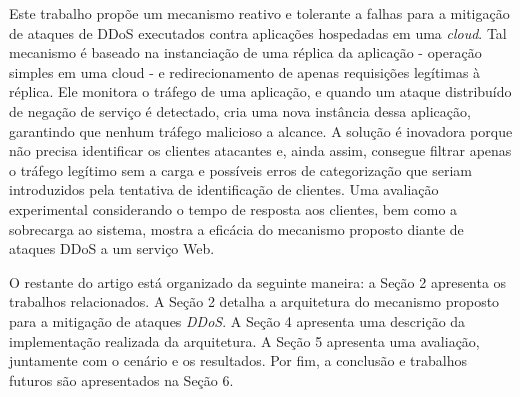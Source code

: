 Este trabalho propõe um mecanismo reativo e tolerante a falhas para a mitigação de ataques de DDoS executados contra aplicações hospedadas em uma \emph{cloud}. Tal mecanismo é baseado na instanciação de uma réplica da aplicação - operação simples em uma cloud - e redirecionamento de apenas requisições legítimas à réplica.  Ele monitora o tráfego de uma aplicação, e quando um ataque distribuído de negação de serviço é detectado, cria uma nova instância dessa aplicação, garantindo que nenhum tráfego malicioso a alcance. A solução é inovadora porque não precisa identificar os clientes atacantes e, ainda assim, consegue filtrar apenas o tráfego legítimo sem a carga e possíveis erros de categorização que seriam introduzidos pela tentativa de identificação de clientes. Uma avaliação experimental considerando o tempo de resposta aos clientes, bem como a sobrecarga ao sistema, mostra a eficácia do mecanismo proposto diante de ataques DDoS a um serviço Web.

O restante do artigo está organizado da seguinte maneira: a Seção 2 apresenta os trabalhos relacionados. A Seção 2 detalha a arquitetura do mecanismo proposto para a mitigação de ataques \emph{DDoS}. A Seção 4 apresenta uma descrição da implementação realizada da arquitetura. A Seção 5 apresenta uma avaliação, juntamente com o cenário e os resultados. Por fim, a conclusão e trabalhos futuros são apresentados na Seção 6.
